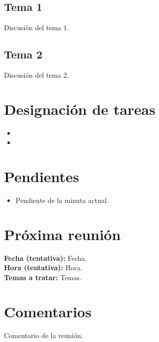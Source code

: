 \documentclass[spanish]{article}
\begin{document}
\subsection*{Tema 1}
Discusión del tema 1.

\subsection*{Tema 2}
Discusión del tema 2.

\section*{Designación de tareas}
\begin{itemize}
    \item{}
    \item{}
\end{itemize}

\section*{Pendientes}
\begin{itemize}
    \item{Pendiente de la minuta actual.}
\end{itemize}


\newpage
\section*{Próxima reunión}
\textbf{Fecha (tentativa): }Fecha.\\
\textbf{Hora (tentativa): }Hora.\\
\textbf{Temas a tratar: }Temas.

\section*{Comentarios}
Comentario de la reunión.
\end{document}
